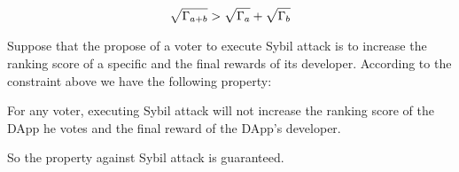 \begin{align}
	\label{eq:sqrt_nr}
	\sqrt{\Gamma_{a+b}}>\sqrt{\Gamma_a}+\sqrt{\Gamma_b}
\end{align}

Suppose that the propose of a voter to execute Sybil attack is to increase the ranking score of a specific and the final rewards of its developer. According to the constraint above we have the following property:


\begin{property}
	\label{p3}
    For any voter, executing Sybil attack will not increase the ranking score of the DApp he votes and the final reward of the DApp's developer.
\end{property}
So the property against Sybil attack is guaranteed.
